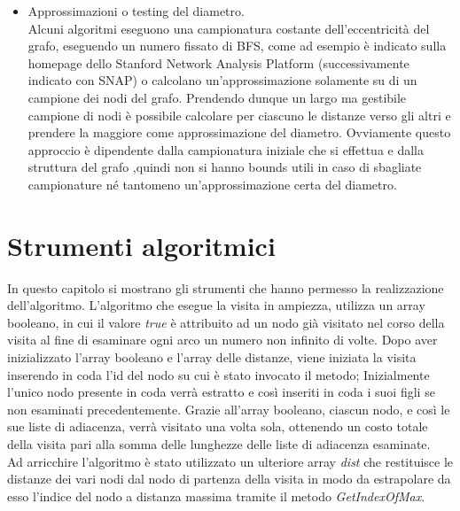 \documentclass[twoside,openright,titlepage,fleqn,
	headinclude,11pt,a4paper,BCOR5mm,footinclude,pdftex
	]{scrbook}
\begin{document}
\begin{itemize}
\item Approssimazioni o testing del diametro.\\
Alcuni algoritmi eseguono una campionatura costante dell'eccentricità del grafo, eseguendo un numero fissato di BFS, come ad esempio è indicato sulla homepage dello Stanford Network Analysis Platform (successivamente indicato con SNAP) o calcolano un'approssimazione solamente su di un campione dei nodi del grafo. Prendendo dunque un largo ma gestibile campione di nodi è possibile calcolare per ciascuno le distanze verso gli altri e prendere la maggiore come approssimazione del diametro. Ovviamente questo approccio è dipendente dalla campionatura iniziale che si effettua e dalla struttura del grafo ,quindi non si hanno bounds utili in caso di sbagliate campionature né tantomeno un'approssimazione certa del diametro.

\end{itemize}
\chapter{Strumenti algoritmici}
In questo capitolo si mostrano gli strumenti che hanno permesso la realizzazione dell'algoritmo.
L'algoritmo che esegue la visita in ampiezza, utilizza un array booleano, in cui il valore \textit{true} è attribuito ad un nodo già visitato nel corso della visita al fine di esaminare ogni arco un numero non infinito di volte. Dopo aver inizializzato l'array booleano e l'array delle distanze, viene iniziata la visita inserendo in coda l'id del nodo su cui è stato invocato il metodo; Inizialmente l'unico nodo presente in coda verrà estratto e così inseriti in coda i suoi figli se non esaminati precedentemente. Grazie all'array booleano, ciascun nodo, e così le sue liste di adiacenza, verrà visitato una volta sola, ottenendo un costo totale della visita pari alla somma delle lunghezze delle liste di adiacenza esaminate.\\
Ad arricchire l'algoritmo è stato utilizzato un ulteriore array \textit{dist} che restituisce le distanze dei vari nodi dal nodo di partenza della visita in modo da estrapolare da esso l'indice del nodo a distanza massima tramite il metodo \textit{GetIndexOfMax}.\\
\end{document}
